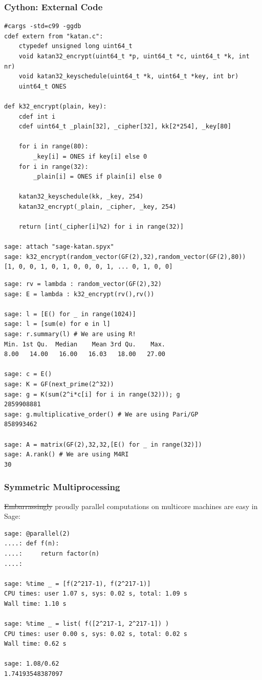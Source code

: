 \documentclass[10pt]{beamer}
\begin{document}
\begin{frame}
\frametitle{Cython: External Code}
\begin{lstlisting}
#cargs -std=c99 -ggdb
cdef extern from "katan.c":
    ctypedef unsigned long uint64_t
    void katan32_encrypt(uint64_t *p, uint64_t *c, uint64_t *k, int nr)
    void katan32_keyschedule(uint64_t *k, uint64_t *key, int br)
    uint64_t ONES

def k32_encrypt(plain, key):
    cdef int i
    cdef uint64_t _plain[32], _cipher[32], kk[2*254], _key[80]

    for i in range(80):
        _key[i] = ONES if key[i] else 0
    for i in range(32):
        _plain[i] = ONES if plain[i] else 0

    katan32_keyschedule(kk, _key, 254)
    katan32_encrypt(_plain, _cipher, _key, 254)

    return [int(_cipher[i]%2) for i in range(32)]

sage: attach "sage-katan.spyx"
sage: k32_encrypt(random_vector(GF(2),32),random_vector(GF(2),80))
[1, 0, 0, 1, 0, 1, 0, 0, 0, 1, ... 0, 1, 0, 0]
\end{lstlisting}

\framebreak


\begin{lstlisting}
sage: rv = lambda : random_vector(GF(2),32)
sage: E = lambda : k32_encrypt(rv(),rv())

sage: l = [E() for _ in range(1024)]
sage: l = [sum(e) for e in l]
sage: r.summary(l) # We are using R!
Min. 1st Qu.  Median    Mean 3rd Qu.    Max.
8.00   14.00   16.00   16.03   18.00   27.00

sage: c = E()
sage: K = GF(next_prime(2^32))
sage: g = K(sum(2^i*c[i] for i in range(32))); g
2859908881
sage: g.multiplicative_order() # We are using Pari/GP
858993462

sage: A = matrix(GF(2),32,32,[E() for _ in range(32)])
sage: A.rank() # We are using M4RI
30
\end{lstlisting}


\end{frame}


\begin{frame}[fragile]
\frametitle{Symmetric Multiprocessing}

\sout{Embarrassingly} proudly parallel computations on multicore machines are easy in Sage:

\begin{lstlisting}
sage: @parallel(2)
....: def f(n):
....:     return factor(n)
....:

sage: %time _ = [f(2^217-1), f(2^217-1)]
CPU times: user 1.07 s, sys: 0.02 s, total: 1.09 s
Wall time: 1.10 s

sage: %time _ = list( f([2^217-1, 2^217-1]) )
CPU times: user 0.00 s, sys: 0.02 s, total: 0.02 s
Wall time: 0.62 s

sage: 1.08/0.62
1.74193548387097
\end{lstlisting}
\end{frame}
\end{document}
